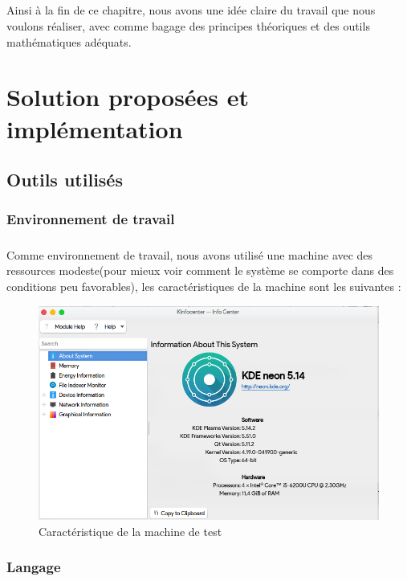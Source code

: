 \documentclass[12pt]{report}
\begin{document}
	\paragraph{}
	Ainsi à la fin de ce chapitre, nous avons une idée claire du travail que nous voulons réaliser, avec comme bagage des 
	principes théoriques et des outils mathématiques adéquats.
\chapter{Solution proposées et implémentation}

	\section{Outils utilisés}
	
		\subsection{Environnement de travail}
		\paragraph{}
		Comme environnement de travail, nous avons utilisé une machine avec des ressources modeste(pour mieux
		voir comment le système se comporte dans des conditions peu favorables), les caractéristiques de la 
		machine sont les suivantes :
		
		\begin{figure}[H]
			\centering
			\includegraphics[scale=0.75]{imgs/machineA.png}
			\caption{Caractéristique de la machine de test}
			\label{fig:CenterCorrect}
		\end{figure}
		
		\subsection{Langage}
\end{document}
